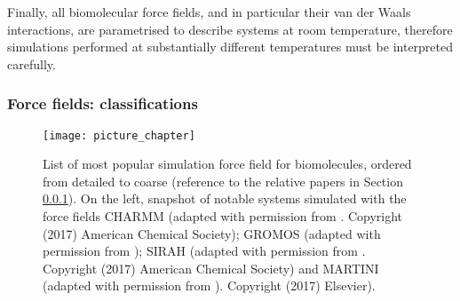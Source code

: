 \documentclass[graybox]{svmult}
\begin{document}
Finally, all biomolecular force fields, and in particular their van der Waals interactions, are parametrised to describe systems at room temperature, therefore simulations performed at substantially different temperatures must be interpreted carefully.


\subsubsection{Force fields: classifications} \label{sec:ff_ex}

\begin{figure}[p!]
\centering
\texttt{[image: picture\_chapter]}
%
\caption{List of most popular simulation force field for biomolecules, ordered from detailed to coarse (reference to the relative papers in Section \ref{sec:ff_ex}). On the left, snapshot of notable systems simulated with the force fields CHARMM (adapted with permission from \cite{Lipkin2017}. Copyright (2017) American Chemical Society); GROMOS (adapted with permission from \cite{Macpherson2019}); SIRAH (adapted with permission from \cite{Machado2017}. Copyright (2017) American Chemical Society) and MARTINI (adapted with permission from \cite{Samsudin2017}). Copyright (2017) Elsevier).}
\label{fig:ff}
\end{figure}
\end{document}

